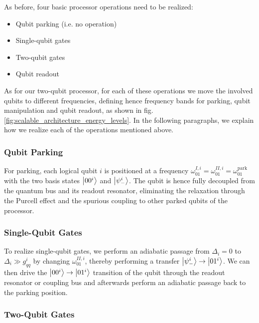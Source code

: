 \smallskip

As before, four basic processor operations need to be realized:

\begin{itemize}
\item Qubit parking (i.e. no operation)
\item Single-qubit gates
\item Two-qubit gates
\item Qubit readout
\end{itemize}

As for our two-qubit processor, for each of these operations we move the involved qubits to different frequencies, defining hence frequency bands for parking, qubit manipulation and qubit readout, as shown in fig. \ref{fig:scalable_architecture_energy_levels}. In the following paragraphs, we explain how we realize each of the operations mentioned above.

\subsubsection{Qubit Parking}

For parking, each logical qubit $i$ is positioned at a frequency $\omega_{01}^{I,i}=\omega_{01}^{II,i}=\omega_{01}^{\mathrm{park}}$ with the two basis states $\left| 00^i \right>$ and $\left| \psi_-^i \right>$. The qubit is hence fully decoupled from the quantum bus and its readout resonator, eliminating the relaxation through the Purcell effect and the spurious coupling to other parked qubits of the processor. 

\subsubsection{Single-Qubit Gates}

To realize single-qubit gates, we perform an adiabatic passage from $\Delta_i = 0$ to $\Delta_i \gg g_{qq}^i$ by changing $\omega_{01}^{II,i}$, thereby performing a transfer $\left| \psi_-^i \right>\to\left| 01^i \right>$. We can then drive the $\left| 00^i \right>\to\left| 01^i \right>$ transition of the qubit through the readout resonator or coupling bus and afterwards perform an adiabatic passage back to the parking position.

\subsubsection{Two-Qubit Gates}


